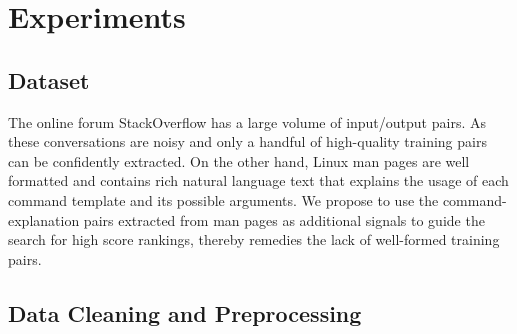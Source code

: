\section{Experiments}

\subsection{Dataset}

The online forum StackOverflow has a large volume of input/output pairs. As these conversations are noisy and only a handful of high-quality training pairs can be confidently extracted. On the other hand, Linux man pages are well formatted and contains rich natural language text that explains the usage of each command template and its possible arguments. We propose to use the command-explanation pairs extracted from man pages as additional signals to guide the search for high score rankings, thereby remedies the lack of well-formed training pairs.

\subsection{Data Cleaning and Preprocessing}